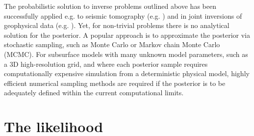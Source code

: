 The probabilistic solution to inverse problems outlined above has been successfully applied e.g. to seismic tomography (e.g. \citet{Sambridge1999,Shapiro2002,Trampert2004,Khan2011}) and in joint inversions of geophysical data (e.g. \citet{khan2007joint,Moorkamp2010,Bodin2012,Shen2012,afonso2013a,afonso2013b,afonso2016}). Yet, for non-trivial problems there is no analytical solution for the posterior. A popular approach is to approximate the posterior via stochastic sampling, such as Monte Carlo or Markov chain Monte Carlo (MCMC). For subsurface models with many unknown model parameters, such as a 3D high-resolution grid, and where each posterior sample requires computationally expensive simulation from a deterministic physical model, highly efficient numerical sampling methods are required if the posterior is to be adequately defined within the current computational limits. \par




\section{The likelihood}



